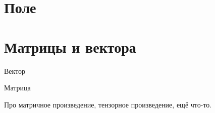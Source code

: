 \section{Поле}

\section{Матрицы и вектора}

Вектор

Матрица 

Про матричное произведение, тензорное произведение, ещё что-то.

